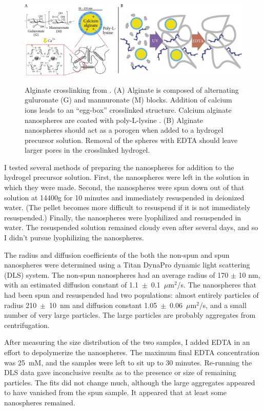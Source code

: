 \begin{figure}
\caption[Alginate nanospheres as porogens.]{Alginate crosslinking from \cite{bruchet15}.  (A) Alginate is composed of alternating guluronate (G) and mannuronate (M) blocks.  Addition of calcium ions leads to an ``egg-box'' crosslinked structure. Calcium alginate nanospheres are coated with poly-L-lysine \cite{de03}.  (B) Alginate nanospheres should act as a porogen when added to a hydrogel precursor solution.  Removal of the spheres with EDTA should leave larger pores in the crosslinked hydrogel.}
\centering
\includegraphics[width=\textwidth]{figs/ch03/alginate-cartoon2}
\label{fig:alginate}
\end{figure}

I tested several methods of preparing the nanospheres for addition to the hydrogel precursor solution.  First, the nanospheres were left in the solution in which they were made.  Second, the nanospheres were spun down out of that solution at 14400g for 10 minutes and immediately resuspended in deionized water.  (The pellet becomes more difficult to resuspend if it is not immediately resuspended.) Finally, the nanospheres were lyophilized and resuspended in water.  The resuspended solution remained cloudy even after several days, and so I didn't pursue lyophilizing the nanospheres.

The radius and diffusion coefficients of the both the non-spun and spun nanospheres were determined using a Titan DynaPro dynamic light scattering (DLS) system.  The non-spun nanospheres had an average radius of 170 $\pm$ 10 nm, with an estimated diffusion constant of 1.1~$\pm$~0.1~$\mu$m$^2$/s.  The nanospheres that had been spun and resuspended had two populations: almost entirely particles of radius 210~$\pm$~10~nm and diffusion constant 1.05~$\pm$~0.06~$\mu$m$^2$/s, and a small number of very large particles.  The large particles are probably aggregates from centrifugation.

After measuring the size distribution of the two samples, I added EDTA in an effort to depolymerize the nanospheres.  The maximum final EDTA concentration was 25~mM, and the samples were left to sit up to 30 minutes.  Re-running the DLS data gave inconclusive results as to the presence or size of remaining particles.  The fits did not change much, although the large aggregates appeared to have vanished from the spun sample.  It appeared that at least some nanospheres remained.

